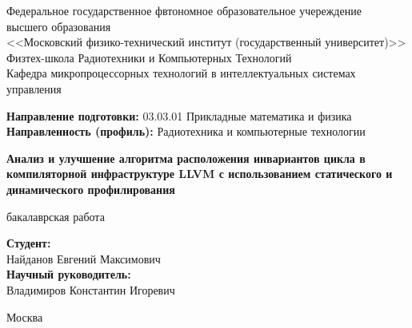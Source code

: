 \begin{center}
    Федеральное государственное фвтономное образовательное учереждение\\
    высшего образования\\
    <<Московский физико-технический институт (государственный университет)>> \\

    Физтех-школа Радиотехники и Компьютерных Технологий \\

    Кафедра микропроцессорных технологий в интеллектуальных системах управления\\

\end{center}

\vspace{1em}

\begin{flushleft}

    \textbf{Направление подготовки:} 03.03.01 Прикладные математика и физика\\
    \textbf{Направленность (профиль):} Радиотехника и компьютерные технологии\\

\end{flushleft}


\begin{center}
    \vspace{\fill}
    \Large{\textbf{Анализ и улучшение алгоритма расположения инвариантов цикла в компиляторной инфраструктуре LLVM с использованием статического и динамического профилирования}}

    \normalsize{бакалаврская работа}
    \vspace{\fill}
\end{center}


\begin{flushright}
    \textbf{Студент:}\\
    Найданов Евгений Максимович\\
    \vspace{2em}
    \textbf{Научный руководитель:} \\
    Владимиров Константин Игоревич \\
\end{flushright}

\vspace{7em}

\begin{center}
    Москва \the\year{}
\end{center}

\thispagestyle{empty}

\newpage
\fancyfoot[c]{\thepage}
